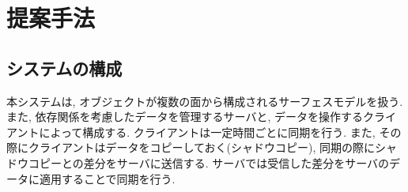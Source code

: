 \chapter{提案手法} \label{chap:method}

\section{システムの構成}
本システムは, オブジェクトが複数の面から構成されるサーフェスモデルを扱う. また, 依存関係を考慮したデータを管理するサーバと, データを操作するクライアントによって構成する. クライアントは一定時間ごとに同期を行う. また, その際にクライアントはデータをコピーしておく(シャドウコピー), 同期の際にシャドウコピーとの差分をサーバに送信する. サーバでは受信した差分をサーバのデータに適用することで同期を行う.
